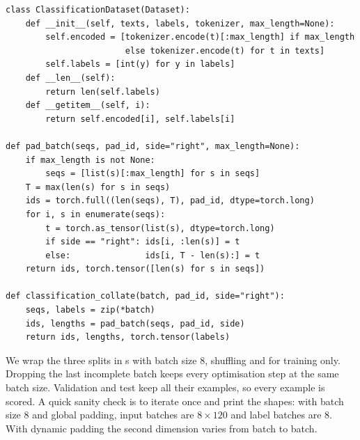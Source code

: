 \begin{lstlisting}[caption={A dataset that stores token lists, and a collate function that pads per batch and returns lengths.},label={lst:classify:collate}]
class ClassificationDataset(Dataset):
    def __init__(self, texts, labels, tokenizer, max_length=None):
        self.encoded = [tokenizer.encode(t)[:max_length] if max_length
                        else tokenizer.encode(t) for t in texts]
        self.labels = [int(y) for y in labels]
    def __len__(self):
        return len(self.labels)
    def __getitem__(self, i):
        return self.encoded[i], self.labels[i]

def pad_batch(seqs, pad_id, side="right", max_length=None):
    if max_length is not None:
        seqs = [list(s)[:max_length] for s in seqs]
    T = max(len(s) for s in seqs)
    ids = torch.full((len(seqs), T), pad_id, dtype=torch.long)
    for i, s in enumerate(seqs):
        t = torch.as_tensor(list(s), dtype=torch.long)
        if side == "right": ids[i, :len(s)] = t
        else:               ids[i, T - len(s):] = t
    return ids, torch.tensor([len(s) for s in seqs])

def classification_collate(batch, pad_id, side="right"):
    seqs, labels = zip(*batch)
    ids, lengths = pad_batch(seqs, pad_id, side)
    return ids, lengths, torch.tensor(labels)
\end{lstlisting}

We wrap the three splits in s with batch size 8, shuffling and
 for training only. Dropping the last incomplete batch keeps every
optimisation step at the same batch size. Validation and test keep all their examples,
so every example is scored. A quick sanity check is to iterate once and print the
shapes: with batch size 8 and global padding, input batches are $8 \times 120$ and label
batches are $8$. With dynamic padding the second dimension varies from batch to batch.

